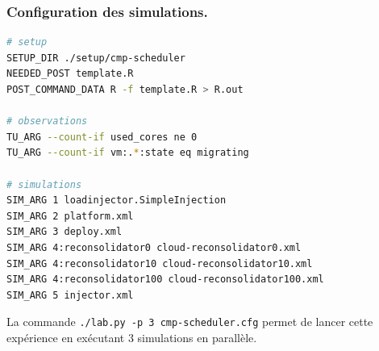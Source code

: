 \documentclass{beamer}
\begin{document}
\begin{frame}[fragile]
	\frametitle{Configuration des simulations.}
\begin{lstlisting}[language=bash,basicstyle=\tt\footnotesize,backgroundcolor=\color{gray!10},
morekeywords={SETUP_DIR,TU_ARG,NEEDED_POST,POST_COMMAND_DATA,SIM_ARG},
keywordstyle=\color{red!90},commentstyle=\color{blue!70}]
# setup
SETUP_DIR ./setup/cmp-scheduler
NEEDED_POST template.R
POST_COMMAND_DATA R -f template.R > R.out

# observations
TU_ARG --count-if used_cores ne 0
TU_ARG --count-if vm:.*:state eq migrating

# simulations
SIM_ARG 1 loadinjector.SimpleInjection
SIM_ARG 2 platform.xml 
SIM_ARG 3 deploy.xml
SIM_ARG 4:reconsolidator0 cloud-reconsolidator0.xml
SIM_ARG 4:reconsolidator10 cloud-reconsolidator10.xml 
SIM_ARG 4:reconsolidator100 cloud-reconsolidator100.xml
SIM_ARG 5 injector.xml
\end{lstlisting}
La commande \texttt{./lab.py -p 3 cmp-scheduler.cfg} permet de lancer cette
expérience en exécutant 3 simulations en parallèle.
\end{frame}
\end{document}
